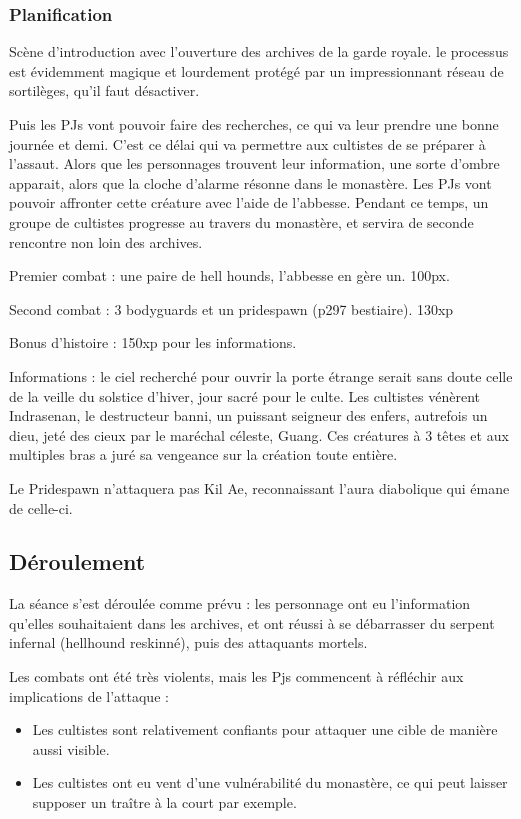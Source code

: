 \documentclass[10pt,a4paper]{book}
\begin{document}
\subsubsection{Planification}
Scène d'introduction avec l'ouverture des archives de la garde royale. le processus est évidemment magique et lourdement protégé par un impressionnant réseau de sortilèges, qu'il faut désactiver. 

Puis les PJs vont pouvoir faire des recherches, ce  qui va leur prendre une bonne journée et demi. C'est ce délai qui va permettre aux cultistes de se préparer à l'assaut. Alors que les personnages trouvent leur information, une sorte d'ombre apparait, alors que la cloche d'alarme résonne dans le monastère. Les PJs vont pouvoir affronter cette créature avec l'aide de l'abbesse. Pendant ce temps, un groupe de cultistes progresse au travers du monastère, et servira de seconde rencontre non loin des archives.

Premier combat : une paire de hell hounds, l'abbesse en gère un. 100px.

Second combat : 3 bodyguards et un pridespawn (p297 bestiaire). 130xp

Bonus d'histoire : 150xp pour les informations.

Informations : le ciel recherché pour ouvrir la porte étrange serait sans doute celle de la veille du solstice d'hiver, jour sacré pour le culte. Les cultistes vénèrent Indrasenan, le destructeur banni, un puissant seigneur des enfers, autrefois un dieu, jeté des cieux par le maréchal céleste, Guang. Ces créatures à 3 têtes et aux multiples bras a juré sa vengeance sur la création toute entière.

Le Pridespawn n'attaquera pas Kil Ae, reconnaissant l'aura diabolique qui émane de celle-ci.
\subsection{Déroulement}
La séance s'est déroulée comme prévu : les personnage ont eu l'information qu'elles souhaitaient dans les archives, et ont réussi à se débarrasser du serpent infernal (hellhound reskinné), puis des attaquants mortels.

Les combats ont été très violents, mais les Pjs commencent à réfléchir aux implications de l'attaque : 
\begin{itemize}
\item Les cultistes sont relativement confiants pour attaquer une cible de manière aussi visible.
\item Les cultistes ont eu vent d'une vulnérabilité du monastère, ce qui peut laisser supposer un traître à la court par exemple.
\end{itemize}
\end{document}
